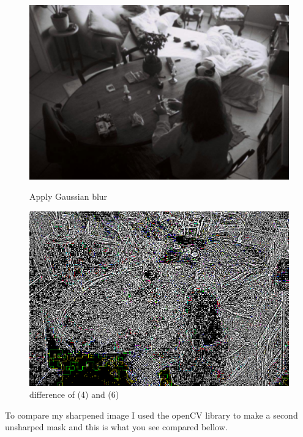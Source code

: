 \documentclass{article}
\begin{document}
\begin{figure}[h!]
\centering
  \begin{minipage}[b]{0.45\textwidth}
    \includegraphics[width=\textwidth]{Q2_blur.png}
    \caption{Apply Gaussian blur}
  \end{minipage}
  \hfill
  \begin{minipage}[b]{0.45\textwidth}
    \includegraphics[width=\textwidth]{Q2_diff.png}
    \caption{difference of (4) and (6)}
  \end{minipage}
\end{figure}

To compare my sharpened image I used the openCV library to make a second unsharped mask and this is what you see compared bellow.
\end{document}

